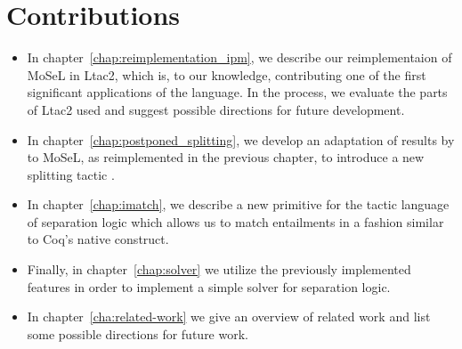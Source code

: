 \section{Contributions}
\label{sec:contributions}

\begin{itemize}
\item In chapter~\ref{chap:reimplementation_ipm}, we describe our reimplementaion of MoSeL in Ltac2, which is, to our knowledge, contributing one of the first significant applications of the language.
  In the process, we evaluate the parts of Ltac2 used and suggest possible directions for future development.
\item In chapter~\ref{chap:postponed_splitting}, we develop an adaptation of results by \citet{harlandResourceDistributionBooleanConstraints2003} to MoSeL, as reimplemented in the previous chapter, to introduce a new splitting tactic .
\item In chapter~\ref{chap:imatch}, we describe a new primitive  for the tactic language of separation logic which allows us to match entailments in a fashion similar to Coq's native  construct.
\item Finally, in chapter~\ref{chap:solver} we utilize the previously implemented features in order to implement a simple solver for separation logic.
\item In chapter~\ref{cha:related-work} we give an overview of related work and list some possible directions for future work.
\end{itemize}


